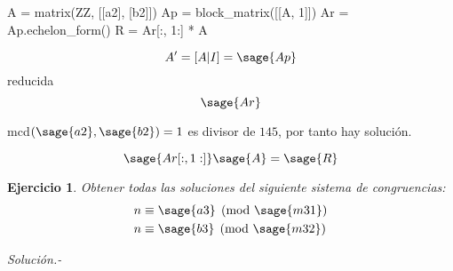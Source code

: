 \documentclass{amsart}
\newtheorem{ejer}{Ejercicio}
\begin{document}


\begin{sageblock}
	A = matrix(ZZ, [[a2], [b2]])
	Ap = block_matrix([[A, 1]])
	Ar = Ap.echelon_form()
	R = Ar[:, 1:] * A
\end{sageblock}

$$
	A' = [A|I] = \sage{Ap}
$$
reducida
$$
	\sage{Ar}
$$

mcd$(\sage{a2}, \sage{b2}) = 1$ es divisor de $145$, por tanto hay solución.

$$
	\sage{Ar[:, 1:]} \sage{A} = \sage{R}
$$





\vskip 1cm

\begin{ejer} Obtener todas las soluciones del siguiente sistema de congruencias:
\begin{align*}
n &\equiv \sage{a3} \pmod{\sage{m31}} \\
n &\equiv \sage{b3} \pmod{\sage{m32}} \\
\end{align*}
\end{ejer}
{\it Solución.-} 









\end{document}
